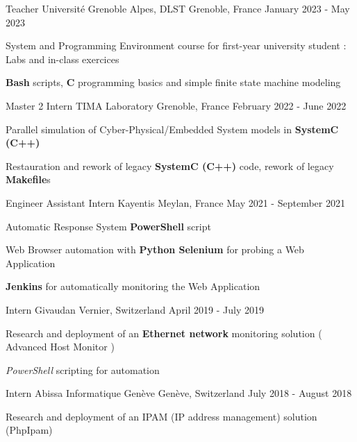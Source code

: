 \begin{cventries}
	\cventry
	{Teacher} %
	{Université Grenoble Alpes, DLST} %
	{Grenoble, France} %
	{January 2023 - May 2023} %
	{
		\begin{cvitems} %
		\item{System and Programming Environment course for first-year university student : Labs and in-class exercices}
		\item{\textbf{Bash} scripts, \textbf{C} programming basics and simple finite state machine modeling}
		\end{cvitems}
	}

	\cventry
	{Master 2 Intern} %
	{TIMA Laboratory} %
	{Grenoble, France} %
	{February 2022 - June 2022} %
	{
		\begin{cvitems} %
		\item{Parallel simulation of Cyber-Physical/Embedded System models in \textbf{SystemC (C++)}}
		\item {Restauration and rework of legacy \textbf{SystemC (C++)} code, rework of legacy \textbf{Makefile}s}		
		\end{cvitems}
	}

	\cventry
	{Engineer Assistant Intern} %
	{Kayentis} %
	{Meylan, France} %
	{May 2021 - September 2021} %
	{
		\begin{cvitems} %
		\item {Automatic Response System \textbf{PowerShell} script}
		\item {Web Browser automation with \textbf{Python Selenium} for probing a Web Application}
		\item {\textbf{Jenkins} for automatically monitoring the Web Application}
		\end{cvitems}
	}

	\cventry
	{Intern} %
	{Givaudan} %
	{Vernier, Switzerland} %
	{April 2019 - July 2019} %
	{
		\begin{cvitems} %
		\item {Research and deployment of an \textbf{Ethernet network} monitoring solution ( Advanced Host Monitor )}
		\item {\emph{PowerShell} scripting for automation}
		\end{cvitems}
	}

	\cventry
	{Intern} %
	{Abissa Informatique Genève} %
	{Genève, Switzerland} %
	{July 2018 - August 2018} %
	{
		\begin{cvitems} %
		\item {Research and deployment of an IPAM (IP address management) solution (PhpIpam)}
		\end{cvitems}
	}
\end{cventries}
